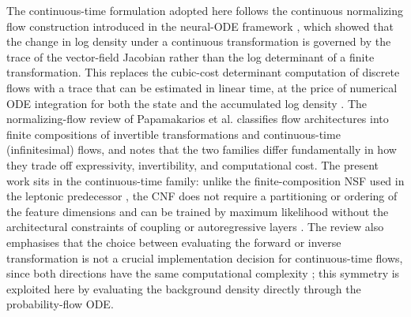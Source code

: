 \documentclass[11pt,a4paper,twocolumn]{article}
\begin{document}
The continuous-time formulation adopted here follows the continuous
normalizing flow construction introduced in the neural-ODE framework
\cite{chen_neural_ode}, which showed that the change in log density under a
continuous transformation is governed by the trace of the vector-field
Jacobian rather than the log determinant of a finite transformation. This
replaces the cubic-cost determinant computation of discrete flows with a
trace that can be estimated in linear time, at the price of numerical ODE
integration for both the state and the accumulated log density
\cite{chen_neural_ode}. The normalizing-flow review of Papamakarios et al.
\cite{papamakarios_flows} classifies flow architectures into finite
compositions of invertible transformations and continuous-time
(infinitesimal) flows, and notes that the two families differ
fundamentally in how they trade off expressivity, invertibility, and
computational cost. The present work sits in the continuous-time family:
unlike the finite-composition NSF used in the leptonic predecessor
\cite{durkan_nsf,rasineni_nsf_monoz}, the CNF does not require a
partitioning or ordering of the feature dimensions and can be trained by
maximum likelihood without the architectural constraints of coupling or
autoregressive layers \cite{chen_neural_ode,papamakarios_flows}. The
review also emphasises that the choice between evaluating the forward or
inverse transformation is not a crucial implementation decision for
continuous-time flows, since both directions have the same computational
complexity \cite{papamakarios_flows}; this symmetry is exploited here by
evaluating the background density directly through the probability-flow
ODE.
\end{document}
